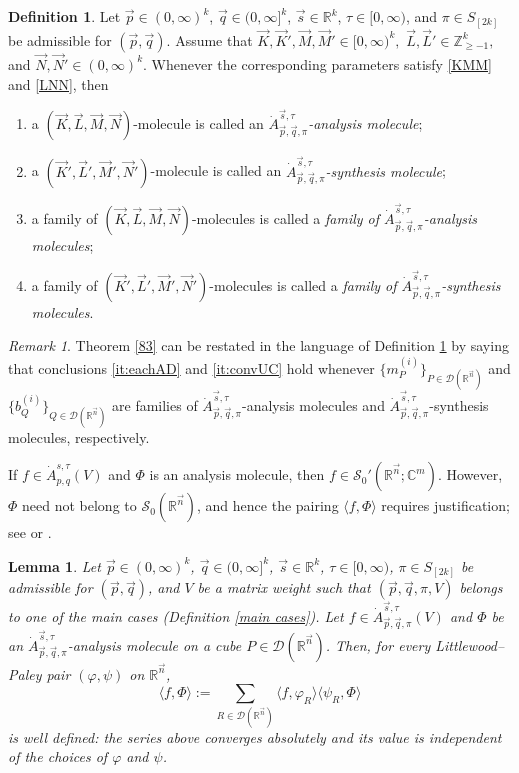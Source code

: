 \documentclass[11pt, reqno]{amsart}
\newtheorem{lemma}[theorem]{Lemma}
\theoremstyle{definition}
\newtheorem{definition}[theorem]{Definition}
\theoremstyle{remark}
\newtheorem{remark}[theorem]{Remark}
\numberwithin{equation}{section}
\newcommand{\C}{\mathbb C}
\newcommand{\R}{\mathbb R}
\newcommand{\Z}{\mathbb Z}
\newcommand{\vn}{\vec n}
\newcommand{\vp}{\vec p}
\newcommand{\vq}{\vec q}
\newcommand{\vs}{\vec s}
\newcommand{\Atau}{\dot A^{\vs,\tau}_{\vp,\vq,\pi}}
\begin{document}
\begin{definition}\label{def:AtauMole}
Let $\vp\in(0,\infty)^k$, $\vq\in(0,\infty]^k$, $\vs\in\R^k$,
$\tau\in[0,\infty)$, and $\pi\in S_{[2k]}$ be admissible for $(\vp,\vq)$.
Assume that $\vec K,\vec K',\vec M,\vec M'\in[0,\infty)^k,$ $\vec L,\vec L'\in\Z_{\geq-1}^k,$ and $\vec N,\vec N'\in(0,\infty)^k$.
Whenever the corresponding parameters satisfy \eqref{KMM} and \eqref{LNN}, then
\begin{enumerate}[\rm(i)]
  \item a $(\vec K,\vec L,\vec M,\vec N)$-molecule is called an \emph{$\dot A^{\vec s,\tau}_{\vec p,\vec q,\pi}$-analysis molecule};
  \item a $(\vec K',\vec L',\vec M',\vec N')$-molecule is called an \emph{$\dot A^{\vec s,\tau}_{\vec p,\vec q,\pi}$-synthesis molecule};
  \item a family of $(\vec K,\vec L,\vec M,\vec N)$-molecules is called a \emph{family of $\dot A^{\vec s,\tau}_{\vec p,\vec q,\pi}$-analysis molecules};
  \item a family of $(\vec K',\vec L',\vec M',\vec N')$-molecules is called a \emph{family of $\dot A^{\vec s,\tau}_{\vec p,\vec q,\pi}$-synthesis molecules}.
\end{enumerate}
\end{definition}

\begin{remark}\label{rem:83}
Theorem \ref{83} can be restated in the language of Definition \ref{def:AtauMole} by saying that conclusions \eqref{it:eachAD} and \eqref{it:convUC} hold whenever $\{m_P^{(i)}\}_{P\in\mathscr D(\R^{\vn})}$ and $\{b^{(i)}_Q\}_{Q\in\mathscr D(\R^{\vn})}$ are families of $\Atau$-analysis molecules and $\Atau$-synthesis molecules, respectively.
\end{remark}

If $f\in\dot A^{s,\tau}_{p,q}(V)$ and $\Phi$ is an analysis molecule,
then $f\in\mathscr{S}_0'(\R^{\vn};\C^m)$.
However, $\Phi$ need not belong to $\mathscr{S}_0(\R^{\vn})$,
and hence the pairing $\langle f,\Phi\rangle$ requires justification;
see \cite[p.\,155]{FJ90} or \cite[Lemma 5.7]{BH06}.

\begin{lemma}\label{88}
Let $\vp\in(0,\infty)^k$, $\vq\in(0,\infty]^k$, $\vs\in\R^k$, $\tau\in[0,\infty)$,
$\pi\in S_{[2k]}$ be admissible for $(\vp,\vq)$,
and $V$ be a matrix weight such that $(\vp,\vq,\pi,V)$ belongs
to one of the main cases (Definition \ref{main cases}).
Let $f\in\Atau(V)$ and $\Phi$ be an
$\dot A^{\vec s,\tau}_{\vec p,\vec q,\pi}$-analysis molecule on a cube $P\in\mathscr{D}(\R^{\vn})$.
Then, for every Littlewood--Paley pair $(\varphi,\psi)$ on $\R^{\vn}$,
\begin{equation}\label{881}
\langle f,\Phi\rangle
:=\sum_{R\in\mathscr{D}(\R^{\vn})}\langle f,\varphi_R\rangle\langle\psi_R,\Phi\rangle
\end{equation}
is well defined: the series above converges absolutely and its value is independent of the choices of $\varphi$ and $\psi$.
\end{lemma}
\end{document}
